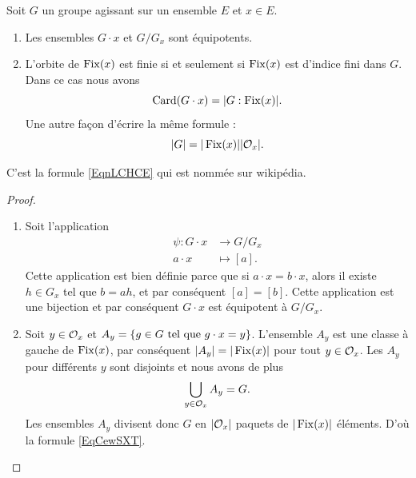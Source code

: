 \begin{proposition}     \label{Propszymlr}
    Soit \( G\) un groupe agissant sur un ensemble \( E\) et \( x\in E\).
    \begin{enumerate}
        \item
            Les ensembles \( G\cdot x\) et \( G/G_x\) sont équipotents.
        \item       \label{ITEMooCWUGooCOFHYk}
            L'orbite de \(\operatorname{Fix}(x)\) est finie si et seulement si \( \operatorname{Fix}(x)\) est d'indice fini dans \( G\). Dans ce cas nous avons
            \begin{equation}        \label{EqnLCHCE}
                \operatorname{Card}(G\cdot x)=| G:\operatorname{Fix}(x) |.
            \end{equation}
            Une autre façon d'écrire la même formule :
            \begin{equation}        \label{EqCewSXT}
                | G |=| \operatorname{Fix}(x) | |\mathcal{O}_x |.
            \end{equation}
    \end{enumerate}
\end{proposition}
C'est la formule \eqref{EqnLCHCE} qui est nommée  sur wikipédia.

\begin{proof}
    \begin{enumerate}
        \item
    Soit l'application
    \begin{equation}
        \begin{aligned}
            \psi\colon G\cdot x&\to G/G_x \\
            a\cdot x&\mapsto [a].
        \end{aligned}
    \end{equation}
    Cette application est bien définie parce que si \( a\cdot x=b\cdot x\), alors il existe \( h\in G_x\) tel que \( b=ah\), et par conséquent \( [a]=[b]\). Cette application est une bijection et par conséquent \( G\cdot x\) est équipotent à \( G/G_x\).
    \item
        Soit \( y\in \mathcal{O}_x\) et \( A_y=\{ g\in G\text{ tel que } g\cdot x=y \}\). L'ensemble \( A_y\) est une classe à gauche de \( \operatorname{Fix}(x)\), par conséquent \( | A_y |=|\operatorname{Fix}(x)|\) pour tout \( y\in\mathcal{O}_x\). Les \( A_y\) pour différents \( y\) sont disjoints et nous avons de plus
        \begin{equation}
            \bigcup_{y\in\mathcal{O}_x}A_y=G.
        \end{equation}
        Les ensembles \( A_y\) divisent donc \( G\) en \( | \mathcal{O}_x |\) paquets de \( | \operatorname{Fix}(x) |\) éléments. D'où la formule \eqref{EqCewSXT}.

    \end{enumerate}
\end{proof}

